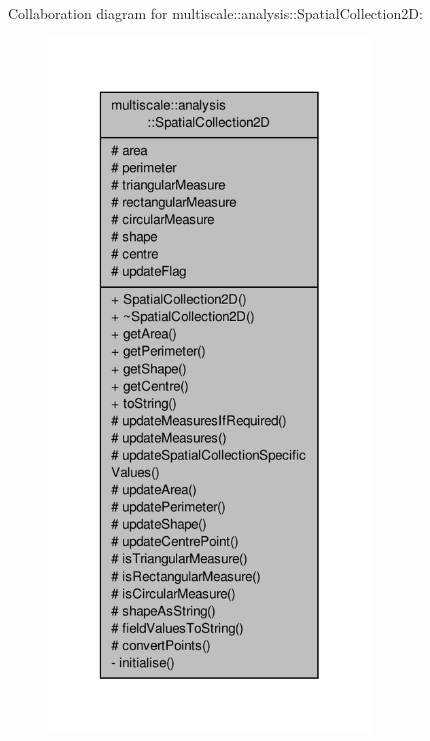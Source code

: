 Collaboration diagram for multiscale\-:\-:analysis\-:\-:Spatial\-Collection2\-D\-:\nopagebreak
\begin{figure}[H]
\begin{center}
\leavevmode
\includegraphics[width=242pt]{classmultiscale_1_1analysis_1_1SpatialCollection2D__coll__graph}
\end{center}
\end{figure}
